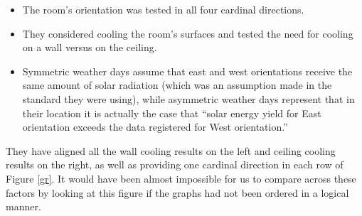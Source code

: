 \documentclass[10pt]{article}
\begin{document}
\vspace{-3pt}
\begin{itemize}
    \setlength{\itemsep}{0pt}%
    \setlength{\parskip}{0pt}%
    \item The room's orientation was tested in all four cardinal directions.
    \item They considered cooling the room's surfaces and tested the need for cooling on a wall versus on the ceiling.
    \item Symmetric weather days assume that east and west orientations receive the same amount of solar radiation (which was an assumption made in the standard they were using), while asymmetric weather days represent that in their location it is actually the case that ``solar energy yield for East orientation exceeds the data registered for West orientation.'' \cite{L_Szabo2018-nh}
\end{itemize}
\vspace{-3pt}

They have aligned all the wall cooling results on the left and ceiling cooling results on the right, as well as providing one cardinal direction in each row of Figure \ref{gr}. It would have been almost impossible for us to compare across these factors by looking at this figure if the graphs had not been ordered in a logical manner.
\end{document}
